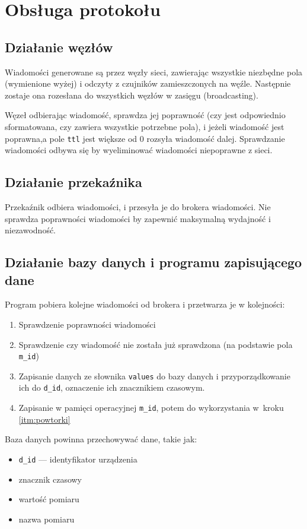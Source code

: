 \section{Obsługa protokołu}

\subsection{Działanie węzłów}
Wiadomości generowane są przez węzły sieci, zawierając wszystkie niezbędne pola (wymienione wyżej) i odczyty z czujników zamieszczonych na węźle. Następnie zostaje ona rozesłana do wszystkich węzłów w zasięgu (broadcasting).

Węzeł odbierając wiadomość, sprawdza jej poprawność (czy jest odpowiednio sformatowana, czy zawiera wszystkie potrzebne pola), i jeżeli wiadomość jest poprawna,a pole \texttt{ttl} jest większe od 0 rozsyła wiadomość dalej.
Sprawdzanie wiadomości odbywa się by wyeliminować wiadomości niepoprawne z sieci.


\subsection{Działanie przekaźnika}
Przekaźnik odbiera wiadomości, i przesyła je do brokera wiadomości. Nie sprawdza poprawności wiadomości by zapewnić maksymalną wydajność i niezawodność.

\subsection{Działanie bazy danych i programu zapisującego dane}
Program pobiera kolejne wiadomości od brokera i przetwarza je w kolejności:
\begin{enumerate}
    \item Sprawdzenie poprawności wiadomości
    \item \label{itm:powtorki} Sprawdzenie czy wiadomość nie została już sprawdzona (na podstawie pola \texttt{m\_id})
    \item Zapisanie danych ze słownika \texttt{values} do bazy danych i przyporządkowanie ich do \texttt{d\_id}, oznaczenie ich znacznikiem czasowym.
    \item Zapisanie w pamięci operacyjnej \texttt{m\_id}, potem do wykorzystania w~kroku \ref{itm:powtorki}
\end{enumerate}
Baza danych powinna przechowywać dane, takie jak:
\begin{itemize}
    \item \texttt{d\_id} — identyfikator urządzenia
    \item znacznik czasowy
    \item wartość pomiaru
    \item nazwa pomiaru
\end{itemize}

